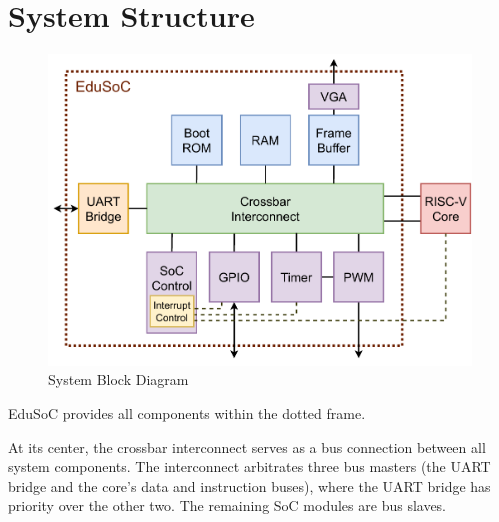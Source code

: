 \section{System Structure}\label{sec:structure}
\begin{figure}[H]
    \centering
    \includegraphics[width=\textwidth]{graphics/EduSoC Block Diagram.pdf}
    \vspace{-2em}
    \caption{System Block Diagram}
    \label{fig:block_diagram}
\end{figure}
EduSoC provides all components within the dotted frame. 

At its center, the crossbar interconnect serves as a bus connection between all system components.
The interconnect arbitrates three bus masters (the UART bridge and the core's data and instruction buses), where the UART bridge has priority over the other two.
The remaining SoC modules are bus slaves.

